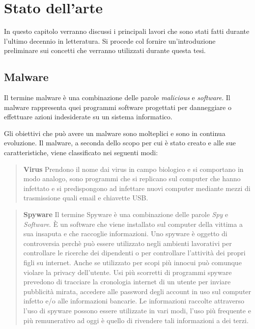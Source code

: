 \documentclass[../main.tex]{subfiles}
\begin{document}
\chapter{Stato dell'arte}

In questo capitolo verranno discussi i principali lavori che sono stati fatti durante l'ultimo decennio in letteratura. Si procede col fornire un'introduzione preliminare sui concetti che verranno utilizzati durante questa tesi.

\section{Malware}
Il termine malware è una combinazione delle parole \textit{malicious} e \textit{software}. Il malware rappresenta quei programmi software progettati per danneggiare o effettuare azioni indesiderate su un sistema informatico. \cite{MalwareDef}

Gli obiettivi che può avere un malware sono molteplici e sono in continua evoluzione. Il malware, a seconda dello scopo per cui è stato creato e alle sue caratteristiche, viene classificato nei seguenti modi:

\begin{verse}
				\textbf{Virus} Prendono il nome dai virus in campo biologico e si comportano in modo analogo, sono programmi che si replicano sul computer che hanno infettato e si predispongono ad infettare nuovi computer mediante mezzi di trasmissione quali email e chiavette USB. \cite{VirusDef}
\end{verse}

\begin{verse}
				\textbf{Spyware} Il termine Spyware è una combinazione delle parole \textit{Spy} e \textit{Software}. È un software che viene installato sul computer della vittima a sua insaputa e che raccoglie informazioni. 
				Uno spyware è oggetto di controversia perchè può essere utilizzato negli ambienti lavorativi per controllare le ricerche dei dipendenti o per controllare l'attività dei propri figli su internet. Anche se utilizzato per scopi più innocui può comunque violare la privacy dell'utente. \cite{Spyware2} \newline
				Usi più scorretti di programmi spyware prevedono di tracciare la cronologia internet di un utente per inviare pubblicità mirata, accedere alle password degli account in uso sul computer infetto e/o alle informazioni bancarie. Le informazioni raccolte attraverso l'uso di spyware possono essere utilizzate in vari modi, l'uso più frequente e più remunerativo ad oggi è quello di rivendere tali informazioni a dei terzi. \cite{Spyware1}
\end{verse}
\end{document}

